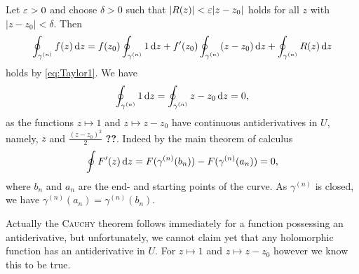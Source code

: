 \documentclass[a4paper,english]{article}
\begin{document}
\begin{pr}
    Let $\varepsilon > 0$ and choose $\delta > 0$ such that $| R(z) | < \varepsilon | z - z_0 |$ holds for all $z$ with $| z - z_0 | < \delta$.
    Then
    \begin{equation*}
        \oint_{\gamma^{(n)}} f(z) \mathop{}\!\mathrm{d}{z}
        = f(z_0) \oint_{\gamma^{(n)}} 1 \mathop{}\!\mathrm{d}{z}
        + f'(z_0) \oint_{\gamma^{(n)}} (z - z_0) \mathop{}\!\mathrm{d}{z}
        + \oint_{\gamma^{(n)}} R(z) \mathop{}\!\mathrm{d}{z}
    \end{equation*}
    holds by \eqref{eq:Taylor1}.
    We have
    \begin{equation*}
        \oint_{\gamma^{(n)}} 1 \mathop{}\!\mathrm{d}{z}
        = \oint_{\gamma^{(n)}} z - z_0 \mathop{}\!\mathrm{d}{z}
        = 0,
    \end{equation*}
    as the functions $z \mapsto 1$ and $z \mapsto z - z_0$ have continuous antiderivatives in $U$, namely, $z$ and $\frac{(z - z_0)^2}{2}$ \textbf{??}.
    Indeed by the main theorem of calculus
    \begin{equation*}
        \oint F'(z) \mathop{}\!\mathrm{d}{z}
        = F(\gamma^{(n)}(b_n)) - F(\gamma^{(n)}(a_n))
        = 0,
    \end{equation*}
    where $b_n$ and $a_n$ are the end- and starting points of the curve.
    As $\gamma^{(n)}$ is closed, we have $\gamma^{(n)}(a_n) = \gamma^{(n)}(b_n)$.
    
    \begin{remark}
        Actually the \textsc{Cauchy} theorem follows immediately for a function possessing an antiderivative, but unfortunately, we cannot claim yet that any holomorphic function has an antiderivative in $U$.
        For $z \mapsto 1$ and $z \mapsto z - z_0$ however we know this to be true.
    \end{remark}
    

\end{pr}
\end{document}
